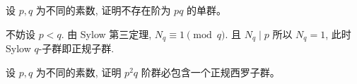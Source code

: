 

    

\begin{problem}
    设 $p,q $ 为不同的素数, 证明不存在阶为 $pq $ 的单群。
\end{problem}

\begin{solution}
    不妨设 $ p<q$. 由 Sylow 第三定理, $N_{q}\equiv1\pmod{q}$. 且 $N_{q}\mid p$
    所以 $N_{q}=1$, 此时 Sylow $q$-子群即正规子群.
\end{solution}

\begin{problem}
    设 $p,q $ 为不同的素数, 证明 $p^2 q $ 阶群必包含一个正规西罗子群。
\end{problem}


